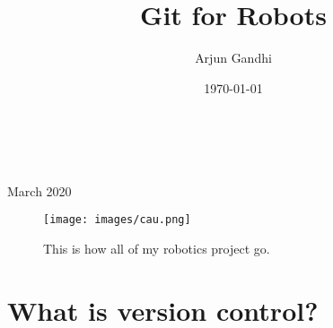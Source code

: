 \documentclass{article}
\title{Git for Robots}
\author{Arjun Gandhi}
\date{\today}
\begin{document}

\newtheorem*{defi}{Definition}
\newenvironment{definition}%
  {\begin{mdframed}[backgroundcolor=defcolor]\begin{defi}}%
  {\end{defi}\end{mdframed}}
\newtheorem*{conce}{Concept}
\newenvironment{concept}%
  {\begin{mdframed}[backgroundcolor=concolor]\begin{conce}}%
  {\end{conce}\end{mdframed}}
\newtheorem{gold}{Golden Rule}
\newenvironment{golden-rule}%
  {\begin{mdframed}[backgroundcolor=goldcolor]\begin{gold}}%
  {\end{gold}\end{mdframed}}
  
\newtheorem*{n}{Note}
\newenvironment{note}%
  {\begin{mdframed}[backgroundcolor=ncolor]\begin{n}}%
  {\end{n}\end{mdframed}}
  
\begin{titlepage}
		\\
			
		\vspace{10mm}
		\\
		\vspace{\fill}
		\centering \large{March 2020}
\end{titlepage}


\newpage{}
\thispagestyle {empty}

\vspace*{2cm}

\begin{figure}
    \centering
	\texttt{[image: images/cau.png]}
	\caption{This is how all of my robotics project go.}
\end{figure}

\newpage
{
\hypersetup{
linkcolor=black,
urlcolor=black,}

\tableofcontents

}

\newpage
\section{What is version control?}
\end{document}

